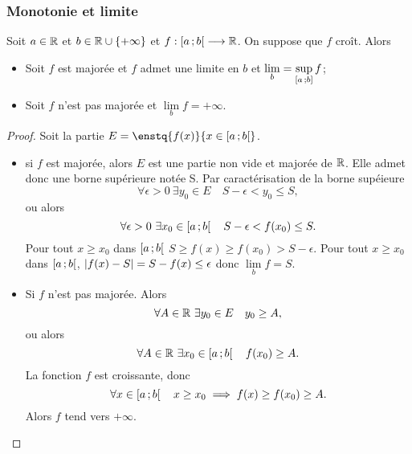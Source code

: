 \subsubsection{Monotonie et limite}

\begin{theo}
  Soit $a \in \mathbb{R}$ et $b \in \mathbb{R}\cup\{+\infty\}$ et $f : \left[ a \, ;  b \right[ \longrightarrow \mathbb{R}$. On suppose que $f$ croît. Alors
  \begin{itemize}
  \item Soit $f$ est majorée et $f$ admet une limite en $b$ et $\lim\limits_{b} = \sup\limits_{\left[ a \, ;  b \right]}f$;
  \item Soit $f$ n'est pas majorée et $\lim\limits_{b}f=+\infty$.
  \end{itemize}
\end{theo}
\begin{proof}
  Soit la partie $E=\enstq{f(x)}{x \in \intervallefo{a}{b}}$.
  \begin{itemize}
  \item si $f$ est majorée, alors $E$ est une partie non vide et majorée de $\mathbb{R}$. Elle admet donc une borne supérieure notée S. Par caractérisation de la borne supéieure
    \begin{equation}
      \forall \epsilon >0 \ \exists y_0 \in E \quad S-\epsilon <y_0 \leq S,
    \end{equation}
    ou alors
    \begin{equation}
      \forall \epsilon >0 \ \exists x_0 \in \left[ a \, ;  b \right[ \quad S-\epsilon <f(x_0) \leq S.
    \end{equation}
    Pour tout $x \geq x_0$ dans $\left[ a \, ;  b \right[$ $S \geq f(x) \geq f(x_0) > S-\epsilon$. Pour tout $x \geq x_0$ dans $\left[ a \, ;  b \right[$, $\left\lvert f(x)-S\right\rvert=S-f(x) \leq \epsilon$ donc $\lim\limits_{b} f =S$.
  \item Si $f$ n'est pas majorée. Alors
    \begin{equation}
      \forall A \in \R \ \exists y_0 \in E \quad y_0 \geq A,
    \end{equation}
    ou alors
    \begin{equation}
      \forall A \in \mathbb{R} \ \exists x_0 \in \left[ a \, ;  b \right[ \quad f(x_0) \geq A.
    \end{equation}
    La fonction $f$ est croissante, donc
    \begin{equation}
      \forall x \in \left[ a \, ;  b \right[ \quad x \geq x_0 \implies f(x) \geq f(x_0) \geq A.
    \end{equation}
    Alors $f$ tend vers $+\infty$.
  \end{itemize}
\end{proof}

